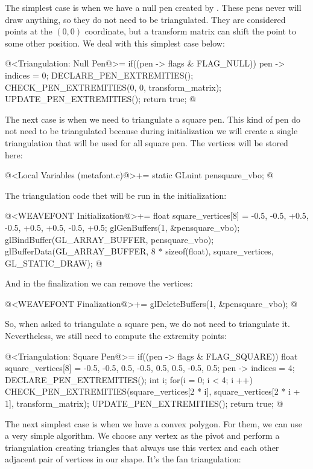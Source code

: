 {{{{{The simplest case is when we have a null pen created
by . These pens never will draw anything, so they
do not need to be triangulated. They are considered points at the $(0,
0)$ coordinate, but a transform matrix can shift the point to some
other position. We deal with this simplest case below:

\iniciocodigo
@<Triangulation: Null Pen@>=
if((pen -> flags & FLAG_NULL)){
  pen -> indices = 0;
  DECLARE_PEN_EXTREMITIES();
  CHECK_PEN_EXTREMITIES(0, 0, transform_matrix);
  UPDATE_PEN_EXTREMITIES();
  return true;
}
@
\fimcodigo

The next case is when we need to triangulate a square pen. This kind
of pen do not need to be triangulated because during initialization we
will create a single triangulation that will be used for all square
pen. The vertices will be stored here:

\iniciocodigo
@<Local Variables (metafont.c)@>+=
static GLuint pensquare_vbo;
@
\fimcodigo

The triangulation code thet will be run in the initialization:

\iniciocodigo
@<WEAVEFONT Initialization@>+=
{
  float square_vertices[8] = {-0.5, -0.5,
                               +0.5, -0.5,
                               +0.5, +0.5,
                               -0.5, +0.5};
  glGenBuffers(1, &pensquare_vbo);
  glBindBuffer(GL_ARRAY_BUFFER, pensquare_vbo);
  glBufferData(GL_ARRAY_BUFFER, 8 * sizeof(float), square_vertices,
               GL_STATIC_DRAW);
}
@
\fimcodigo

And in the finalization we can remove the vertices:

\iniciocodigo
@<WEAVEFONT Finalization@>+=
glDeleteBuffers(1, &pensquare_vbo);
@
\fimcodigo

So, when asked to triangulate a square pen, we do not need to
triangulate it. Nevertheless, we still need to compute the extremity
points:

\iniciocodigo
@<Triangulation: Square Pen@>=
if((pen -> flags & FLAG_SQUARE)){
  float square_vertices[8] = {-0.5, -0.5, 0.5, -0.5, 0.5, 0.5, -0.5, 0.5};
  pen -> indices = 4;
  DECLARE_PEN_EXTREMITIES();
  int i;
  for(i = 0; i < 4; i ++)
    CHECK_PEN_EXTREMITIES(square_vertices[2 * i], square_vertices[2 * i + 1],
                          transform_matrix);
  UPDATE_PEN_EXTREMITIES();
  return true;
}
@
\fimcodigo

The next simplest case is when we have a convex polygon. For them, we
can use a very simple algorithm. We choose any vertex as the pivot and
perform a triangulation creating triangles that always use this vertex
and each other adjacent pair of vertices in our shape. It's the fan
triangulation:

}}}}}
